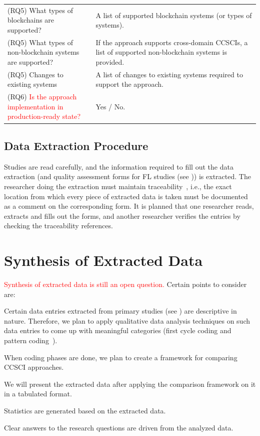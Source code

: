 \documentclass[review]{elsarticle}
\begin{document}
{\begin{landscape}
\begin{table}[ht]
\begin{tabular}{p{0.35\linewidth} | p{0.65\linewidth}}
				(RQ5) What types of blockchains are supported? & A list of supported blockchain systems (or types of systems). \\
				(RQ5) What types of non-blockchain systems are supported? & If the approach supports cross-domain CCSCIs, a list of supported non-blockchain systems is provided. \\
				(RQ5) Changes to existing systems & A list of changes to existing systems required to support the approach. \\
				(RQ6) \textcolor{red}{Is the approach implementation in production-ready state?} & Yes / No. 
			\end{tabular}
		\end{table}
\end{landscape}
}

\subsection{Data Extraction Procedure}
Studies are read carefully, and the information required to fill out the data extraction (and quality assessment forms for FL studies (see )) is extracted.
The researcher doing the extraction must maintain traceability~\cite{Garousi2017MLR}, i.e., the exact location from which every piece of extracted data is taken must be documented as a comment on the corresponding form.
It is planned that one researcher reads, extracts and fills out the forms, and another researcher verifies the entries by checking the traceability references.

\section{Synthesis of Extracted Data}
\label{sec:synthesis-of-extracted-data}
\textcolor{red}{Synthesis of extracted data is still an open question.}
Certain points to consider are:
\begin{list}{-}{}
	\item Certain data entries extracted from primary studies (see ) are descriptive in nature.
	Therefore, we plan to apply qualitative data analysis techniques on such data entries to come up with meaningful categories (first cycle coding and pattern coding~\cite{Miles2014QualitativeDataAnalysis}).
	\item When coding phases are done, we plan to create a framework for comparing CCSCI approaches.
	\item We will present the extracted data after applying the comparison framework on it in a tabulated format.
	\item Statistics are generated based on the extracted data.
	\item Clear answers to the research questions are driven from the analyzed data.
\end{list}
\end{document}
